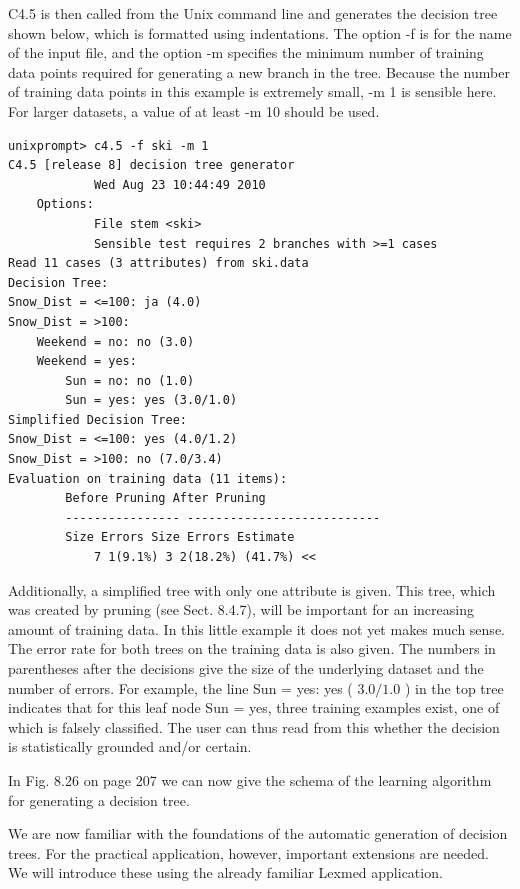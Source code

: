 \documentclass[10pt]{book}
\begin{document}
C4.5 is then called from the Unix command line and generates the decision tree shown below, which is formatted using indentations. The option -f is for the name of the input file, and the option -m specifies the minimum number of training data points required for generating a new branch in the tree. Because the number of training data points in this example is extremely small, -m 1 is sensible here. For larger datasets, a value of at least -m 10 should be used.

\begin{verbatim}
unixprompt> c4.5 -f ski -m 1
C4.5 [release 8] decision tree generator
            Wed Aug 23 10:44:49 2010
    Options:
            File stem <ski>
            Sensible test requires 2 branches with >=1 cases
Read 11 cases (3 attributes) from ski.data
Decision Tree:
Snow_Dist = <=100: ja (4.0)
Snow_Dist = >100:
    Weekend = no: no (3.0)
    Weekend = yes:
        Sun = no: no (1.0)
        Sun = yes: yes (3.0/1.0)
Simplified Decision Tree:
Snow_Dist = <=100: yes (4.0/1.2)
Snow_Dist = >100: no (7.0/3.4)
Evaluation on training data (11 items):
        Before Pruning After Pruning
        ---------------- ---------------------------
        Size Errors Size Errors Estimate
            7 1(9.1%) 3 2(18.2%) (41.7%) <<
\end{verbatim}

Additionally, a simplified tree with only one attribute is given. This tree, which was created by pruning (see Sect. 8.4.7), will be important for an increasing amount of training data. In this little example it does not yet makes much sense. The error rate for both trees on the training data is also given. The numbers in parentheses after the decisions give the size of the underlying dataset and the number of errors. For example, the line Sun = yes: yes ( $3.0 / 1.0$ ) in the top tree indicates that for this leaf node Sun = yes, three training examples exist, one of which is falsely classified. The user can thus read from this whether the decision is statistically grounded and/or certain.

In Fig. 8.26 on page 207 we can now give the schema of the learning algorithm for generating a decision tree.

We are now familiar with the foundations of the automatic generation of decision trees. For the practical application, however, important extensions are needed. We will introduce these using the already familiar Lexmed application.
\end{document}
